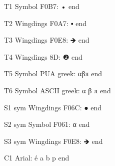 \documentclass[11pt,a4paper]{article}
\begin{document}
T1 Symbol F0B7: • end

T2 Wingdings F0A7: ▪ end

T3 Wingdings F0E8: 🡺 end

T4 Wingdings 8D: ❷ end

T5 Symbol PUA greek: αβπ end

T6 Symbol ASCII greek: α β π end

S1 sym Wingdings F06C: ● end

S2 sym Symbol F061: α end

S3 sym Wingdings F0E8: 🡺 end

C1 Arial: é a b p end
\end{document}
